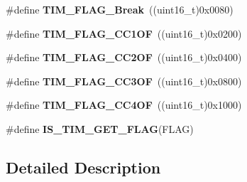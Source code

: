 \begin{DoxyCompactItemize}
\item 
\hypertarget{group___t_i_m___flags_ga166571a1d5ca2bfca5d923eaa22f6deb}{\#define {\bfseries T\-I\-M\-\_\-\-F\-L\-A\-G\-\_\-\-Break}~((uint16\-\_\-t)0x0080)}\label{group___t_i_m___flags_ga166571a1d5ca2bfca5d923eaa22f6deb}

\item 
\hypertarget{group___t_i_m___flags_ga38dfb7d1ed00af77d70bc3be28500108}{\#define {\bfseries T\-I\-M\-\_\-\-F\-L\-A\-G\-\_\-\-C\-C1\-O\-F}~((uint16\-\_\-t)0x0200)}\label{group___t_i_m___flags_ga38dfb7d1ed00af77d70bc3be28500108}

\item 
\hypertarget{group___t_i_m___flags_ga4df0c71d3e695c214d49802942e04590}{\#define {\bfseries T\-I\-M\-\_\-\-F\-L\-A\-G\-\_\-\-C\-C2\-O\-F}~((uint16\-\_\-t)0x0400)}\label{group___t_i_m___flags_ga4df0c71d3e695c214d49802942e04590}

\item 
\hypertarget{group___t_i_m___flags_gac81f24eaffdf83c2db9d2e6078a00919}{\#define {\bfseries T\-I\-M\-\_\-\-F\-L\-A\-G\-\_\-\-C\-C3\-O\-F}~((uint16\-\_\-t)0x0800)}\label{group___t_i_m___flags_gac81f24eaffdf83c2db9d2e6078a00919}

\item 
\hypertarget{group___t_i_m___flags_gafc8b04654766d98ba2c6fed601895a20}{\#define {\bfseries T\-I\-M\-\_\-\-F\-L\-A\-G\-\_\-\-C\-C4\-O\-F}~((uint16\-\_\-t)0x1000)}\label{group___t_i_m___flags_gafc8b04654766d98ba2c6fed601895a20}

\item 
\#define {\bfseries I\-S\-\_\-\-T\-I\-M\-\_\-\-G\-E\-T\-\_\-\-F\-L\-A\-G}(F\-L\-A\-G)
\end{DoxyCompactItemize}


\subsection{Detailed Description}


